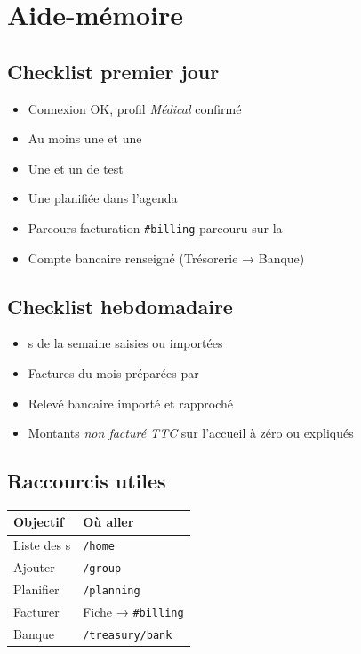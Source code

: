 
\section{Aide-mémoire}
\label{sec:memoire}

\subsection{Checklist premier jour}

\begin{itemize}[label=$\square$, leftmargin=*]
  \item Connexion OK, profil \emph{Médical} confirmé
  \item Au moins une \prestation{} et une \structure{}
  \item Une \seance{} et un \patient{} de test
  \item Une \seance{} planifiée dans l'agenda
  \item Parcours facturation \texttt{\#billing} parcouru sur la \structure{}
  \item Compte bancaire renseigné (Trésorerie → Banque)
\end{itemize}

\subsection{Checklist hebdomadaire}

\begin{itemize}[label=$\square$, leftmargin=*]
  \item \seance{}s de la semaine saisies ou importées
  \item Factures du mois préparées par \structure{}
  \item Relevé bancaire importé et rapproché
  \item Montants \emph{non facturé TTC} sur l'accueil à zéro ou expliqués
\end{itemize}

\subsection{Raccourcis utiles}

\begin{table}[htbp]
  \centering
  \begin{tabular}{@{}ll@{}}
    \toprule
    \textbf{Objectif} & \textbf{Où aller} \\
    \midrule
    Liste des \structure{}s & \texttt{/home} \\
    Ajouter \patient{} & \texttt{/group} \\
    Planifier & \texttt{/planning} \\
    Facturer & Fiche \structure{} → \texttt{\#billing} \\
    Banque & \texttt{/treasury/bank} \\
    \bottomrule
  \end{tabular}
\end{table}

